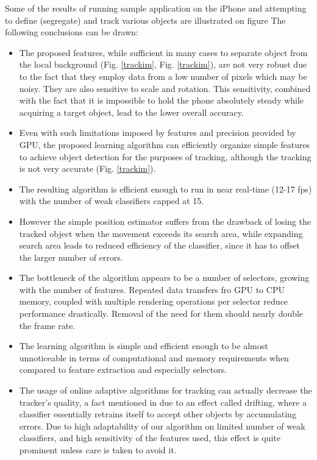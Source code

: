 Some of the results of running sample application on the iPhone and attempting to define (segregate) and track various objects are illustrated on figure 
The following conclusions can be drawn:
\begin{itemize}
\item The proposed features, while sufficient in many cases to separate object from the local background (Fig. \ref{trackim}, Fig. \ref{trackim}), are not very robust due to the fact that they employ data from a low  number of pixels which may be noisy. They are also sensitive to scale and rotation. This sensitivity, combined with the fact that it is impossible to hold the phone absolutely steady while acquiring a target object, lead to the lower overall accuracy. 
\item Even with such limitations imposed by features and precision provided by GPU, the proposed learning algorithm can efficiently organize simple features to achieve object detection for the purposes of tracking, although the tracking is not very accurate (Fig. \ref{trackim}).  
\item The resulting algorithm is efficient enough to run in near real-time (12-17 fps) with the number of weak classifiers capped at 15.
\item However the simple position estimator suffers from the drawback of losing the tracked object when the movement exceeds its search area, while expanding search area leads to reduced efficiency of the classifier, since it has to offset the larger number of errors. 
\item The bottleneck of the algorithm appears to be a number of selectors, growing with the number of features. Repeated data transfers fro GPU to CPU memory, coupled with multiple rendering operations per selector reduce performance drastically. Removal of the need for them should nearly double the frame rate.
\item The learning algorithm is simple and efficient enough to be almost unnoticeable in terms of computational and memory requirements when compared to feature extraction and especially selectors.
\item The usage of online adaptive algorithms for tracking can actually decrease the tracker's quality, a fact mentioned in \cite{grabner2008} due to an effect called drifting, where a classifier essentially retrains itself to accept other objects by accumulating errors. Due to high adaptability of our algorithm on limited number of weak classifiers, and high sensitivity of the features used, this effect is quite prominent unless care is taken to avoid it. 
\end{itemize}

